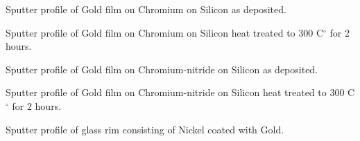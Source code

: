  \newpage

 \vspace*{9cm}

  Sputter profile of Gold film on
 Chromium on Silicon as deposited.\\

 \vspace*{9cm}

  Sputter profile of Gold film on
 Chromium on Silicon heat treated to 300 C$^{\circ}$ for 2
 hours.\\



 \newpage


 \vspace*{9cm}

  Sputter profile of Gold film on
 Chromium-nitride on Silicon as deposited.\\

 \vspace*{9cm}

  Sputter profile of Gold film on
 Chromium-nitride on Silicon heat treated to 300 C$^{\circ}$
 for 2 hours.\\


 \newpage


 \vspace*{12cm}

  Sputter profile of glass rim
 consisting of Nickel coated with Gold.



 \newpage

